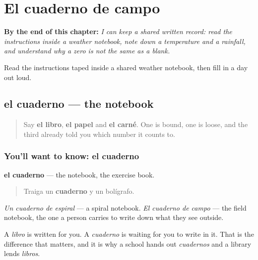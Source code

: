 
\chapter{El cuaderno de campo}
\label{ch:es-apunte}

\begin{chapteropening}
\textbf{By the end of this chapter:} \emph{I can keep a shared written record: read the instructions inside a weather notebook, note down a temperature and a rainfall, and understand why a zero is not the same as a blank.}

Read the instructions taped inside a shared weather notebook, then fill in a day out loud.
\end{chapteropening}

\section[el cuaderno]{el cuaderno — the notebook}

\label{lesson:ES-C465-cuaderno}



\begin{quote}
Say \textbf{el libro}, \textbf{el papel} and \textbf{el carné}. One is bound, one is loose, and the third already told you which number it counts to.
\end{quote}

\subsection*{You'll want to know: el cuaderno}
\textbf{el cuaderno} — the notebook, the exercise book.

\begin{quote}
Traiga un \textbf{cuaderno} y un bolígrafo.
\end{quote}

\emph{Un cuaderno de espiral} — a spiral notebook. \emph{El cuaderno de campo} — the field notebook, the one a person carries to write down what they see outside.

A \emph{libro} is written for you. A \emph{cuaderno} is waiting for you to write in it. That is the difference that matters, and it is why a school hands out \emph{cuadernos} and a library lends \emph{libros}.

